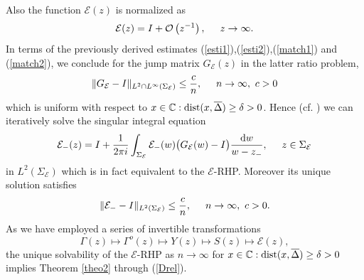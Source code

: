 \documentclass[10pt,oneside,reqno]{amsart}
\numberwithin{equation}{section}
\renewcommand{\d}{{\mathrm d}}
\def\eqref#1{(\ref{#1})}
\begin{document}
Also the function ${\mathcal E}(z)$ is normalized as
\begin{equation*}
  {\mathcal E}(z)=I+\mathcal O\left(z^{-1}\right),\hspace{0.5cm}z\rightarrow\infty.
\end{equation*}
In terms of the previously derived estimates \eqref{esti1},\eqref{esti2},\eqref{match1} and \eqref{match2}, we conclude for the jump matrix $G_{\mathcal E}(z)$ in the latter ratio problem,
\begin{equation}\label{DZ1}
  \|G_{\mathcal E}-I\|_{L^2\cap L^{\infty}(\Sigma_{\mathcal E})}\leq \frac{c}{n},\hspace{0.5cm}n\rightarrow\infty,\ c>0
\end{equation}
which is uniform with respect to $x\in\mathbb{C}:\textnormal{dist}(x,\overline{\Delta})\geq\delta>0$. Hence (cf. \cite{DZ}) we can iteratively solve the singular integral equation 
\begin{equation*}
  {\mathcal E}_-(z) = I+\frac{1}{2\pi i}\int_{\Sigma_{\mathcal E}}{\mathcal E}_-(w)\big(G_{\mathcal E}(w)-I\big)\frac{\d w}{w-z_-},\hspace{0.5cm}z\in\Sigma_{\mathcal E}
\end{equation*}
in $L^2(\Sigma_{\mathcal E})$ which is in fact equivalent to the ${\mathcal E}$-RHP. Moreover its unique solution satisfies 
\begin{equation}\label{DZ2}
  \|{\mathcal E}_--I\|_{L^2(\Sigma_{\mathcal E})}\leq \frac{c}{n},\hspace{0.5cm}n\rightarrow\infty,\ c>0.
\end{equation}
As we have employed a series of invertible transformations
\begin{equation}\label{trace}
  \Gamma(z)\mapsto\Gamma^o(z)\mapsto Y(z)\mapsto S(z)\mapsto {\mathcal E}(z),
\end{equation}
the unique solvability of the ${\mathcal E}$-RHP as $n\rightarrow\infty$ for $x\in\mathbb{C}:\textnormal{dist}(x,\overline{\Delta})\geq\delta>0$ implies Theorem \ref{theo2} through \eqref{Drel}.
\end{document}
